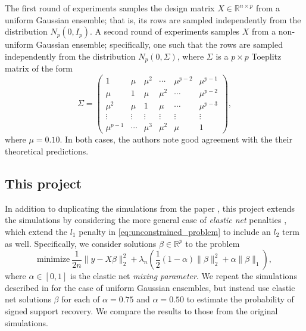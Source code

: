 \documentclass[letterpaper,12pt]{article}
\newcommand{\norm}[1]{\lVert#1\rVert}
\begin{document}
The first round of experiments samples the design matrix
$X \in \mathbb{R}^{n \times p}$ from a uniform Gaussian ensemble; that
is, its rows are sampled independently from the distribution
$N_p(0, I_p)$. A second round of experiments samples $X$ from a
non-uniform Gaussian ensemble; specifically, one such that the rows
are sampled independently from the distribution $N_p(0, \Sigma)$,
where $\Sigma$ is a $p \times p$ Toeplitz matrix of the form
\begin{equation} \label{eq:toeplitz_covariance}
  \Sigma =
  \begin{pmatrix}
    1 & \mu & \mu^2 & \cdots & \mu^{p-2} & \mu^{p-1} \\
    \mu & 1 & \mu & \mu^2 & \cdots & \mu^{p-2} \\
    \mu^2 & \mu & 1 & \mu & \cdots & \mu^{p-3} \\
    \vdots & \vdots & \vdots & \vdots & \vdots & \vdots \\
    \mu^{p-1} & \cdots & \mu^3 & \mu^2 & \mu & 1
  \end{pmatrix},
\end{equation}
where $\mu = 0.10$. In both cases, the authors note good agreement
with the their theoretical predictions.

\subsection*{This project}

In addition to duplicating the simulations from the paper
\cite{wainwright06}, this project extends the simulations by
considering the more general case of \textit{elastic net} penalties
\cite{zou_hastie05}, which extend the $l_1$ penalty in
\eqref{eq:unconstrained_problem} to include an $l_2$ term as
well. Specifically, we consider solutions $\beta \in \mathbb{R}^p$ to
the problem
\begin{equation*}
  \text{minimize} \
    \frac{1}{2n} \norm{y - X\beta}_2^2
      + \lambda_n \left( \frac{1}{2} (1 - \alpha) \norm{\beta}_2^2
      + \alpha \norm{\beta}_1 \right ),
\end{equation*}
where $\alpha \in [0, 1]$ is the elastic net \textit{mixing
  parameter}. We repeat the simulations described in
\cite{wainwright06} for the case of uniform Gaussian ensembles, but
instead use elastic net solutions $\beta$ for each of $\alpha = 0.75$
and $\alpha = 0.50$ to estimate the probability of signed support
recovery. We compare the results to those from the original
simulations.
\end{document}
